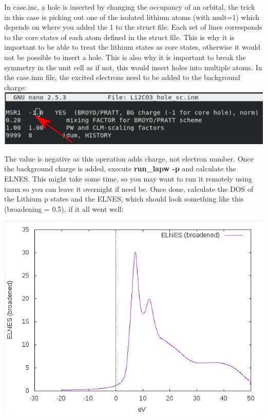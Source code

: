 \documentclass[12pt]{article}
\begin{document}
In case.inc, a hole is inserted by changing the occupancy of an orbital, the trick in this case is picking out one of the isolated lithium atoms (with mult=1) which depends on where you added the 1 to the struct file.  Each set of lines corresponds to the core states of each atom defined in the struct file.  This is why it is important to be able to treat the lithium states as core states, otherwise it would not be possible to insert a hole.  This is also why it is important to break the symmetry in the unit cell as if not, this would insert holes into multiple atoms. In the case.inm file, the excited electrons need to be added to the background charge: \\

\includegraphics[scale=0.5]{./images/hole_inm.png}

The value is negative as this operation adds charge, not electron number.  Once the background charge is added, execute \textbf{run\_lapw -p} and calculate the ELNES. This might take some time, so you may want to run it remotely using tmux so you can leave it overnight if need be.  Once done, calculate the DOS of the Lithium p states and the ELNES, which should look something like this (broadening = 0.5), if it all went well:  

\includegraphics[scale=0.4]{./images/single_cell_hole_elnes.png}\\
\end{document}
